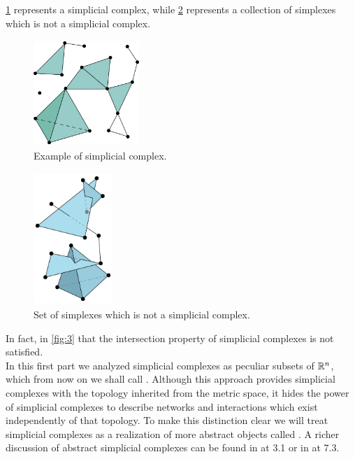 \documentclass[../1.tex]{subfiles}
\begin{document}
    \ref{fig:2} represents a simplicial complex, while \ref{fig:3} represents a collection of simplexes which is not a simplicial complex. 

    
    \begin{figure}[H]
        \centering
        \includegraphics[width=4cm, height=4cm]{sections/1/complex}
        \caption{Example of simplicial complex.}
        \label{fig:2}
    \end{figure} 

    \begin{figure}[H]
        \centering
        \includegraphics[width=3cm, height=5cm]{sections/1/noncomplex}
        \caption{Set of simplexes which is not a simplicial complex.}
        \label{fig:3}
    \end{figure}

    In fact, in \autoref{fig:3} that the intersection property of simplicial complexes is not satisfied.\\

    \newpage
    In this first part we analyzed simplicial complexes as peculiar subsets of $\mathbb{R}^n$, which from now on we shall call .
    Although this approach provides simplicial complexes with the topology inherited from the metric space, it hides the power of simplicial complexes 
    to describe networks and interactions which exist independently of that topology. To make this distinction clear we will treat
    simplicial complexes as a realization of more abstract objects called . A richer discussion of abstract simplicial complexes
    can be found in \cite{comptop} at 3.1 or in \cite{rotman} at 7.3.
    
\end{document}

